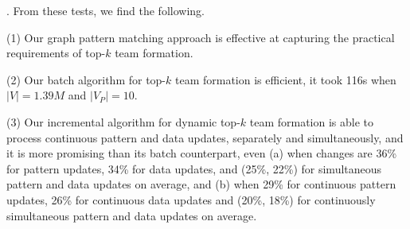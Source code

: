 . From these tests, we find the following.

\sstab(1) Our graph pattern matching approach is effective at capturing the practical requirements of top-$k$ team formation.

\sstab(2) Our batch algorithm for  top-$k$ team formation is efficient,
\eg it took 116s when $|V|=1.39M$ and $|V_P|=10$.

\sstab (3) Our incremental algorithm for dynamic top-$k$ team formation is able to process continuous pattern and data updates, separately and simultaneously,
and it is more promising than its batch counterpart,
even (a) when changes are 36\% for pattern updates, 34\% for data updates, and (25\%, 22\%) for simultaneous pattern and data updates on average,
and (b) when 29\% for continuous pattern updates, 26\% for continuous data updates and (20\%, 18\%) for continuously simultaneous pattern and data updates on average.
